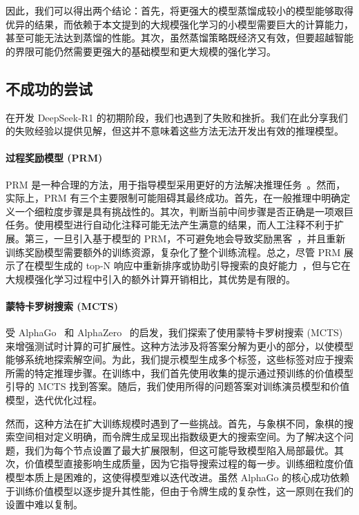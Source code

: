 \documentclass[11pt, a4paper, logo, copyright, nonumbering]{deepseek}
\newcommand{\dsri}{DeepSeek-R1}
\begin{document}
因此，我们可以得出两个结论：首先，将更强大的模型蒸馏成较小的模型能够取得优异的结果，而依赖于本文提到的大规模强化学习的小模型需要巨大的计算能力，甚至可能无法达到蒸馏的性能。其次，虽然蒸馏策略既经济又有效，但要超越智能的界限可能仍然需要更强大的基础模型和更大规模的强化学习。
\subsection{不成功的尝试}
在开发 \dsri{} 的初期阶段，我们也遇到了失败和挫折。我们在此分享我们的失败经验以提供见解，但这并不意味着这些方法无法开发出有效的推理模型。

\paragraph{过程奖励模型 (PRM)}
PRM 是一种合理的方法，用于指导模型采用更好的方法解决推理任务~\citep{uesato2022solving, lightman2023let,mathshepherd}。然而，实际上，PRM 有三个主要限制可能阻碍其最终成功。首先，在一般推理中明确定义一个细粒度步骤是具有挑战性的。其次，判断当前中间步骤是否正确是一项艰巨任务。使用模型进行自动化注释可能无法产生满意的结果，而人工注释不利于扩展。第三，一旦引入基于模型的 PRM，不可避免地会导致奖励黑客~\citep{gao2022scalinglawsrewardmodel}，并且重新训练奖励模型需要额外的训练资源，复杂化了整个训练流程。总之，尽管 PRM 展示了在模型生成的 top-N 响应中重新排序或协助引导搜索的良好能力~\citep{snell2024scalingllmtesttimecompute}，但与它在大规模强化学习过程中引入的额外计算开销相比，其优势是有限的。

\paragraph{蒙特卡罗树搜索 (MCTS)}
受 AlphaGo~\citep{alphago} 和 AlphaZero~\citep{alphazero} 的启发，我们探索了使用蒙特卡罗树搜索 (MCTS) 来增强测试时计算的可扩展性。这种方法涉及将答案分解为更小的部分，以使模型能够系统地探索解空间。为此，我们提示模型生成多个标签，这些标签对应于搜索所需的特定推理步骤。在训练中，我们首先使用收集的提示通过预训练的价值模型引导的 MCTS 找到答案。随后，我们使用所得的问题答案对训练演员模型和价值模型，迭代优化过程。

然而，这种方法在扩大训练规模时遇到了一些挑战。首先，与象棋不同，象棋的搜索空间相对定义明确，而令牌生成呈现出指数级更大的搜索空间。为了解决这个问题，我们为每个节点设置了最大扩展限制，但这可能导致模型陷入局部最优。其次，价值模型直接影响生成质量，因为它指导搜索过程的每一步。训练细粒度价值模型本质上是困难的，这使得模型难以迭代改进。虽然 AlphaGo 的核心成功依赖于训练价值模型以逐步提升其性能，但由于令牌生成的复杂性，这一原则在我们的设置中难以复制。
\end{document}
